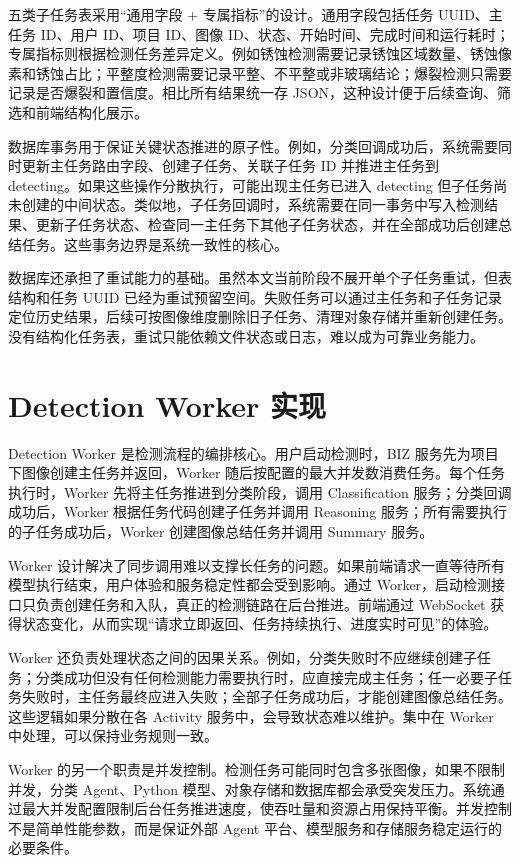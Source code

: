 五类子任务表采用“通用字段 + 专属指标”的设计。通用字段包括任务 UUID、主任务 ID、用户 ID、项目 ID、图像 ID、状态、开始时间、完成时间和运行耗时；专属指标则根据检测任务差异定义。例如锈蚀检测需要记录锈蚀区域数量、锈蚀像素和锈蚀占比；平整度检测需要记录平整、不平整或非玻璃结论；爆裂检测只需要记录是否爆裂和置信度。相比所有结果统一存 JSON，这种设计便于后续查询、筛选和前端结构化展示。

数据库事务用于保证关键状态推进的原子性。例如，分类回调成功后，系统需要同时更新主任务路由字段、创建子任务、关联子任务 ID 并推进主任务到 detecting。如果这些操作分散执行，可能出现主任务已进入 detecting 但子任务尚未创建的中间状态。类似地，子任务回调时，系统需要在同一事务中写入检测结果、更新子任务状态、检查同一主任务下其他子任务状态，并在全部成功后创建总结任务。这些事务边界是系统一致性的核心。

数据库还承担了重试能力的基础。虽然本文当前阶段不展开单个子任务重试，但表结构和任务 UUID 已经为重试预留空间。失败任务可以通过主任务和子任务记录定位历史结果，后续可按图像维度删除旧子任务、清理对象存储并重新创建任务。没有结构化任务表，重试只能依赖文件状态或日志，难以成为可靠业务能力。

\section{Detection Worker 实现}
\label{sec:impl-worker}

Detection Worker 是检测流程的编排核心。用户启动检测时，BIZ 服务先为项目下图像创建主任务并返回，Worker 随后按配置的最大并发数消费任务。每个任务执行时，Worker 先将主任务推进到分类阶段，调用 Classification 服务；分类回调成功后，Worker 根据任务代码创建子任务并调用 Reasoning 服务；所有需要执行的子任务成功后，Worker 创建图像总结任务并调用 Summary 服务。

Worker 设计解决了同步调用难以支撑长任务的问题。如果前端请求一直等待所有模型执行结束，用户体验和服务稳定性都会受到影响。通过 Worker，启动检测接口只负责创建任务和入队，真正的检测链路在后台推进。前端通过 WebSocket 获得状态变化，从而实现“请求立即返回、任务持续执行、进度实时可见”的体验。

Worker 还负责处理状态之间的因果关系。例如，分类失败时不应继续创建子任务；分类成功但没有任何检测能力需要执行时，应直接完成主任务；任一必要子任务失败时，主任务最终应进入失败；全部子任务成功后，才能创建图像总结任务。这些逻辑如果分散在各 Activity 服务中，会导致状态难以维护。集中在 Worker 中处理，可以保持业务规则一致。

Worker 的另一个职责是并发控制。检测任务可能同时包含多张图像，如果不限制并发，分类 Agent、Python 模型、对象存储和数据库都会承受突发压力。系统通过最大并发配置限制后台任务推进速度，使吞吐量和资源占用保持平衡。并发控制不是简单性能参数，而是保证外部 Agent 平台、模型服务和存储服务稳定运行的必要条件。

